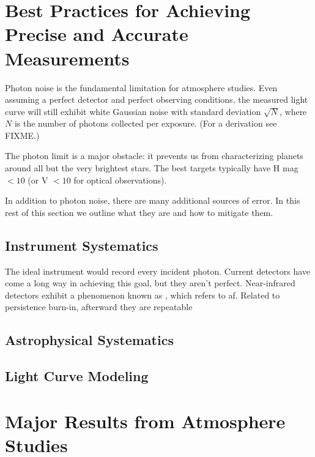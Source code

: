 \documentclass[graybox,natbib,nosecnum]{svmult}
\begin{document}
\section{Best Practices for Achieving Precise and Accurate Measurements}
Photon noise is the fundamental limitation for atmosphere studies. Even assuming a perfect detector and perfect observing conditions, the measured light curve will still exhibit white Gaussian noise with standard deviation $\sqrt{N}$, where $N$ is the number of photons collected per exposure. (For a derivation see FIXME.) 

The photon limit is a major obstacle: it prevents us from characterizing planets around all but the very brightest stars.  The best targets typically have H mag $< 10$ (or V $< 10$ for optical observations).  

In addition to photon noise, there are many additional sources of error. In this rest of this section we outline what they are and how to mitigate them. 

\subsection{Instrument Systematics}
The ideal instrument would record every incident photon. Current detectors have come a long way in achieving this goal, but they aren't perfect. 
Near-infrared detectors exhibit a phenomenon known as , which refers to af. Related to persistence
burn-in, afterward they are repeatable

\subsection{Astrophysical Systematics}
\runinhead{}
\runinhead{}

\subsection{Light Curve Modeling}

\section{Major Results from Atmosphere Studies}
\end{document}
